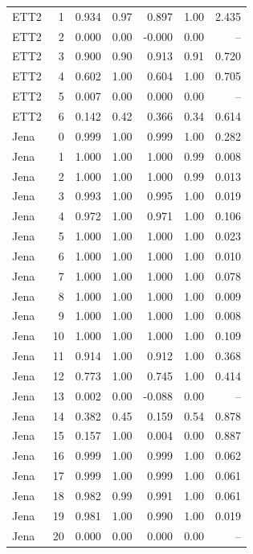 \begin{longtable}{lrrrrrr}
ETT2 & 1 & 0.934 & 0.97 & 0.897 & 1.00 & 2.435 \\
ETT2 & 2 & 0.000 & 0.00 & -0.000 & 0.00 & -- \\
ETT2 & 3 & 0.900 & 0.90 & 0.913 & 0.91 & 0.720 \\
ETT2 & 4 & 0.602 & 1.00 & 0.604 & 1.00 & 0.705 \\
ETT2 & 5 & 0.007 & 0.00 & 0.000 & 0.00 & -- \\
ETT2 & 6 & 0.142 & 0.42 & 0.366 & 0.34 & 0.614 \\
Jena & 0 & 0.999 & 1.00 & 0.999 & 1.00 & 0.282 \\
Jena & 1 & 1.000 & 1.00 & 1.000 & 0.99 & 0.008 \\
Jena & 2 & 1.000 & 1.00 & 1.000 & 0.99 & 0.013 \\
Jena & 3 & 0.993 & 1.00 & 0.995 & 1.00 & 0.019 \\
Jena & 4 & 0.972 & 1.00 & 0.971 & 1.00 & 0.106 \\
Jena & 5 & 1.000 & 1.00 & 1.000 & 1.00 & 0.023 \\
Jena & 6 & 1.000 & 1.00 & 1.000 & 1.00 & 0.010 \\
Jena & 7 & 1.000 & 1.00 & 1.000 & 1.00 & 0.078 \\
Jena & 8 & 1.000 & 1.00 & 1.000 & 1.00 & 0.009 \\
Jena & 9 & 1.000 & 1.00 & 1.000 & 1.00 & 0.008 \\
Jena & 10 & 1.000 & 1.00 & 1.000 & 1.00 & 0.109 \\
Jena & 11 & 0.914 & 1.00 & 0.912 & 1.00 & 0.368 \\
Jena & 12 & 0.773 & 1.00 & 0.745 & 1.00 & 0.414 \\
Jena & 13 & 0.002 & 0.00 & -0.088 & 0.00 & -- \\
Jena & 14 & 0.382 & 0.45 & 0.159 & 0.54 & 0.878 \\
Jena & 15 & 0.157 & 1.00 & 0.004 & 0.00 & 0.887 \\
Jena & 16 & 0.999 & 1.00 & 0.999 & 1.00 & 0.062 \\
Jena & 17 & 0.999 & 1.00 & 0.999 & 1.00 & 0.061 \\
Jena & 18 & 0.982 & 0.99 & 0.991 & 1.00 & 0.061 \\
Jena & 19 & 0.981 & 1.00 & 0.990 & 1.00 & 0.019 \\
Jena & 20 & 0.000 & 0.00 & 0.000 & 0.00 & -- \\
\bottomrule
\end{longtable}
